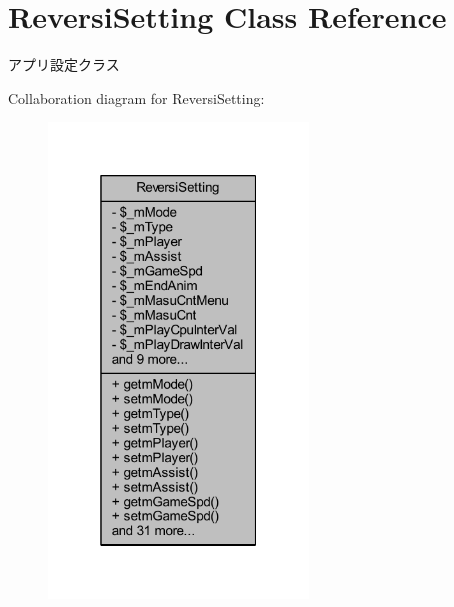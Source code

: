 \hypertarget{class_reversi_setting}{}\section{Reversi\+Setting Class Reference}
\label{class_reversi_setting}


アプリ設定クラス  




Collaboration diagram for Reversi\+Setting\+:
\nopagebreak
\begin{figure}[H]
\begin{center}
\leavevmode
\includegraphics[width=196pt]{class_reversi_setting__coll__graph}
\end{center}
\end{figure}
